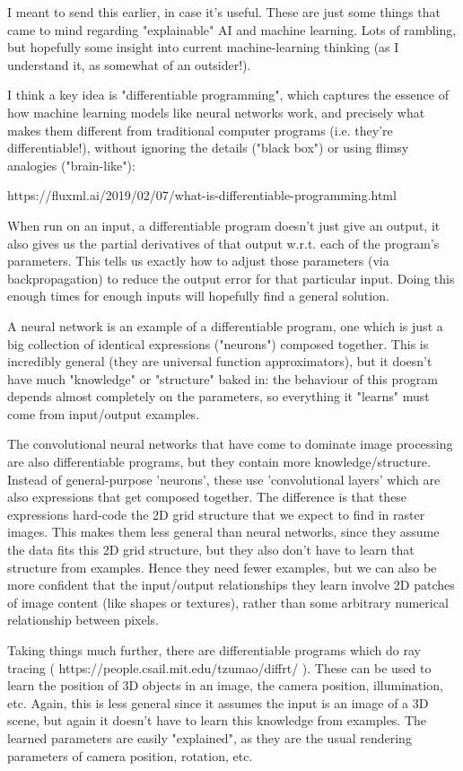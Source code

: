 I meant to send this earlier, in case it's useful. These are just some
things that came to mind regarding "explainable" AI and machine
learning. Lots of rambling, but hopefully some insight into current
machine-learning thinking (as I understand it, as somewhat of an
outsider!).

I think a key idea is "differentiable programming", which captures the
essence of how machine learning models like neural networks work, and
precisely what makes them different from traditional computer programs
(i.e. they're differentiable!), without ignoring the details ("black
box") or using flimsy analogies ("brain-like"):

https://fluxml.ai/2019/02/07/what-is-differentiable-programming.html

When run on an input, a differentiable program doesn't just give an
output, it also gives us the partial derivatives of that output
w.r.t. each of the program's parameters. This tells us exactly how to
adjust those parameters (via backpropagation) to reduce the output error
for that particular input. Doing this enough times for enough inputs
will hopefully find a general solution.

A neural network is an example of a differentiable program, one which is
just a big collection of identical expressions ("neurons") composed
together. This is incredibly general (they are universal function
approximators), but it doesn't have much "knowledge" or "structure"
baked in: the behaviour of this program depends almost completely on the
parameters, so everything it "learns" must come from input/output
examples.

The convolutional neural networks that have come to dominate image
processing are also differentiable programs, but they contain more
knowledge/structure. Instead of general-purpose 'neurons', these use
'convolutional layers' which are also expressions that get composed
together. The difference is that these expressions hard-code the 2D grid
structure that we expect to find in raster images. This makes them less
general than neural networks, since they assume the data fits this 2D
grid structure, but they also don't have to learn that structure from
examples. Hence they need fewer examples, but we can also be more
confident that the input/output relationships they learn involve 2D
patches of image content (like shapes or textures), rather than some
arbitrary numerical relationship between pixels.

Taking things much further, there are differentiable programs which do
ray tracing ( https://people.csail.mit.edu/tzumao/diffrt/ ). These can
be used to learn the position of 3D objects in an image, the camera
position, illumination, etc. Again, this is less general since it
assumes the input is an image of a 3D scene, but again it doesn't have
to learn this knowledge from examples. The learned parameters are easily
"explained", as they are the usual rendering parameters of camera
position, rotation, etc.

